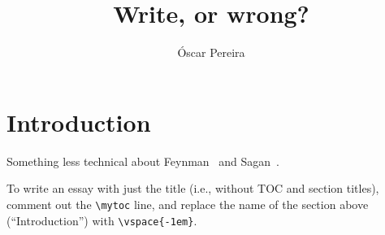 \documentclass[a4paper,12pt,dvipsnames*]{article}
\title{
Write, or wrong?
}
\author{
  Óscar Pereira
}
\date{\vspace{-4em}}
\begin{document}
\maketitle
{}

\mytoc

\section{Introduction}
  \label{sec:intro}
  Something less technical about Feynman~\cite{Feynman74} and Sagan~\cite{Sagan}.

  To write an essay with just the title (i.e., without TOC and section titles), comment out the \verb+\mytoc+ line, and replace the name of the section above (``Introduction'') with \verb+\vspace{-1em}+.

{}


\end{document}
